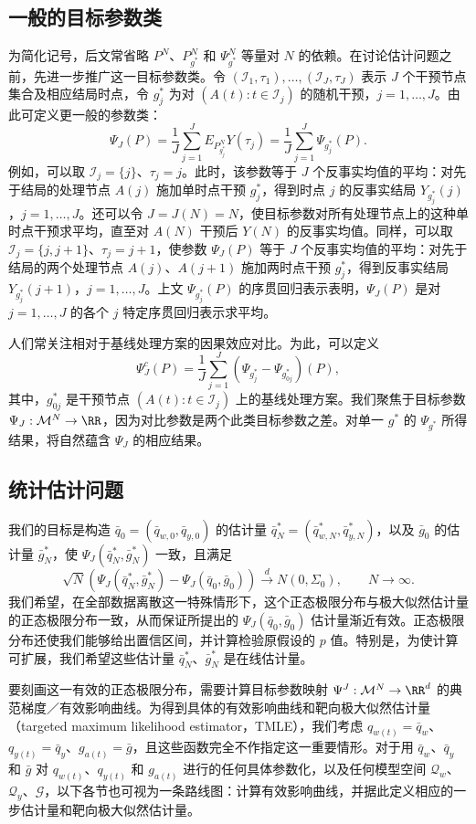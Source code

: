 \subsection{一般的目标参数类}

为简化记号，后文常省略 $P^N$、$P_{g^*}^N$ 和 $\Psi_{g^*}^N$ 等量对 $N$ 的依赖。在讨论估计问题之前，先进一步推广这一目标参数类。令 $(\mathcal I_1,\tau_1),\ldots,(\mathcal I_J,\tau_J)$ 表示 $J$ 个干预节点集合及相应结局时点，令 $g_j^*$ 为对 $(A(t):t\in\mathcal I_j)$ 的随机干预，$j=1,\ldots,J$。由此可定义更一般的参数类：
\[
 \Psi_J(P)=\frac1J\sum_{j=1}^J E_{P^N_{g_j^*}}Y(\tau_j)
 =\frac1J\sum_{j=1}^J\Psi_{g_j^*}(P).
\]
例如，可以取 $\mathcal I_j=\{j\}$、$\tau_j=j$。此时，该参数等于 $J$ 个反事实均值的平均：对先于结局的处理节点 $A(j)$ 施加单时点干预 $g_j^*$，得到时点 $j$ 的反事实结局 $Y_{g_j^*}(j)$，$j=1,\ldots,J$。还可以令 $J=J(N)=N$，使目标参数对所有处理节点上的这种单时点干预求平均，直至对 $A(N)$ 干预后 $Y(N)$ 的反事实均值。同样，可以取 $\mathcal I_j=\{j,j+1\}$、$\tau_j=j+1$，使参数 $\Psi_J(P)$ 等于 $J$ 个反事实均值的平均：对先于结局的两个处理节点 $A(j)$、$A(j+1)$ 施加两时点干预 $g_j^*$，得到反事实结局 $Y_{g_j^*}(j+1)$，$j=1,\ldots,J$。上文 $\Psi_{g_j^*}(P)$ 的序贯回归表示表明，$\Psi_J(P)$ 是对 $j=1,\ldots,J$ 的各个 $j$ 特定序贯回归表示求平均。

人们常关注相对于基线处理方案的因果效应对比。为此，可以定义
\[
 \Psi_J^c(P)=\frac1J\sum_{j=1}^J
 (\Psi_{g_j^*}-\Psi_{g_{0j}^*})(P),
\]
其中，$g_{0j}^*$ 是干预节点 $(A(t):t\in\mathcal I_j)$ 上的基线处理方案。我们聚焦于目标参数 $\Psi_J:\mathcal M^N\to\RR$，因为对比参数是两个此类目标参数之差。对单一 $g^*$ 的 $\Psi_{g^*}$ 所得结果，将自然蕴含 $\Psi_J$ 的相应结果。

\subsection{统计估计问题}

我们的目标是构造 $\bar q_0=(\bar q_{w,0},\bar q_{y,0})$ 的估计量 $\bar q_N^*=(\bar q_{w,N}^*,\bar q_{y,N}^*)$，以及 $\bar g_0$ 的估计量 $\bar g_N^*$，使 $\Psi_J(\bar q_N^*,\bar g_N^*)$ 一致，且满足
\[
 \sqrt N(\Psi_J(\bar q_N^*,\bar g_N^*)-\Psi_J(\bar q_0,\bar g_0))
 \xrightarrow{d}N(0,\Sigma_0),\qquad N\to\infty.
\]
我们希望，在全部数据离散这一特殊情形下，这个正态极限分布与极大似然估计量的正态极限分布一致，从而保证所提出的 $\Psi_J(\bar q_0,\bar g_0)$ 估计量渐近有效。正态极限分布还使我们能够给出置信区间，并计算检验原假设的 $p$ 值。特别是，为使计算可扩展，我们希望这些估计量 $\bar q_N^*$、$\bar g_N^*$ 是在线估计量。

要刻画这一有效的正态极限分布，需要计算目标参数映射 $\Psi^J:\mathcal M^N\to\RR^d$ 的典范梯度／有效影响曲线。为得到具体的有效影响曲线和靶向极大似然估计量（targeted maximum likelihood estimator，TMLE），我们考虑 $q_{w(t)}=\bar q_w$、$q_{y(t)}=\bar q_y$、$g_{a(t)}=\bar g$，且这些函数完全不作指定这一重要情形。对于用 $\bar q_w$、$\bar q_y$ 和 $\bar g$ 对 $q_{w(t)}$、$q_{y(t)}$ 和 $g_{a(t)}$ 进行的任何具体参数化，以及任何模型空间 $\mathcal Q_w$、$\mathcal Q_y$、$\mathcal G$，以下各节也可视为一条路线图：计算有效影响曲线，并据此定义相应的一步估计量和靶向极大似然估计量。
